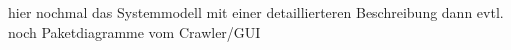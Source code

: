 hier nochmal das Systemmodell mit einer detaillierteren Beschreibung
dann evtl. noch Paketdiagramme vom Crawler/GUI